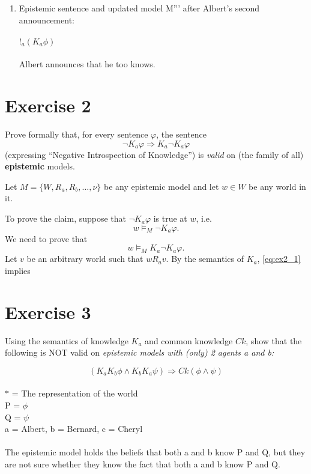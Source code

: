 \documentclass[leqno]{article}
\begin{document}
\begin{enumerate}[label=(\alph*)]
    \item Epistemic sentence and updated model M''' after Albert's second announcement: \\
    \\
    $!_a (K_a \phi)$ \\
    \\
    Albert announces that he too knows.
    \\
    \begin{center}
    \end{center}

\end{enumerate}

\section{Exercise 2}
Prove formally that, for every sentence \(\varphi\), the sentence
\[\neg K_{a}\varphi \Rightarrow K_{a}\neg K_{a}\varphi\]
(expressing ``Negative Introspection of Knowledge'') is \textit{valid} on (the family of all) \textbf{epistemic} models.

Let $M = \{W, R_a, R_b, \dots, \nu\}$ be any epistemic model and let $w \in W$ be any world in it.

To prove the claim, suppose that $\neg K_a \varphi$ is true at $w$, i.e.
\begin{equation}
	\tag{1} \label{eq:ex2_1}
	w \models_M \neg K_a \varphi.
\end{equation}
We need to prove that
\begin{equation}
	\tag{?} \label{eq:ex2_?}
	w \models_M K_a \neg K_a \varphi.
\end{equation}
Let $v$ be an arbitrary world such that $w R_a v$.
By the semantics of $K_a$, \eqref{eq:ex2_1} implies

\section{Exercise 3}
Using the semantics of knowledge \(K_{a}\) and common knowledge \(Ck\), show that the following is NOT valid on \textit{epistemic models with (only) 2 agents a and b:}

\[(K_{a}K_{b}\phi\wedge K_{b}K_{a}\psi) \Rightarrow Ck(\phi\wedge\psi)\]
\\
$*$ = The representation of the world \\
P = $ \phi $ \\
Q = $ \psi $ \\
a = Albert, b = Bernard, c = Cheryl \\
\\
The epistemic model holds the beliefs that both a and b know P and Q, but they are not sure whether they know the fact that both a and b know P and Q.
\end{document}

